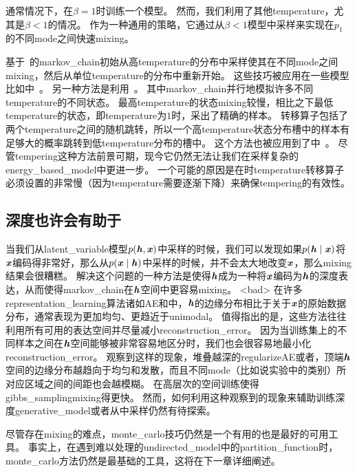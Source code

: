 通常情况下，在$\beta = 1$时训练一个模型。
然而，我们利用了其他\gls{temperature}，尤其是$\beta < 1$的情况。
作为一种通用的策略，它通过从$\beta<1$模型中采样来实现在$p_1$的不同\gls{mode}之间快速\gls{mixing}。

基于~\citep{Neal94b}的\gls{markov_chain}初始从高\gls{temperature}的分布中采样使其在不同\gls{mode}之间\gls{mixing}，然后从单位\gls{temperature}的分布中重新开始。
这些技巧被应用在一些模型比如中~\citep{Salakhutdinov-2010}。
另一种方法是利用~\citep{Iba-2001}。
其中\gls{markov_chain}并行地模拟许多不同\gls{temperature}的不同状态。
最高\gls{temperature}的状态\gls{mixing}较慢，相比之下最低\gls{temperature}的状态，即\gls{temperature}为$1$时，采出了精确的样本。
转移算子包括了两个\gls{temperature}之间的随机跳转，所以一个高\gls{temperature}状态分布槽中的样本有足够大的概率跳转到低\gls{temperature}分布的槽中。
这个方法也被应用到了中~\citep{Desjardins+al-2010-small,Cho10IJCNN}。
尽管\gls{tempering}这种方法前景可期，现今它仍然无法让我们在采样复杂的\gls{energy_based_model}中更进一步。
一个可能的原因是在时\gls{temperature}转移算子必须设置的非常慢（因为\gls{temperature}需要逐渐下降）来确保\gls{tempering}的有效性。



\subsection{深度也许会有助于}
\label{sec:depth_may_help_mixing}

当我们从\gls{latent_variable}模型$p(\boldsymbol{\mathit{h}},\boldsymbol{\mathit{x}})$中采样的时候，我们可以发现如果$p(\boldsymbol{\mathit{h}}\mid \boldsymbol{\mathit{x}})$将$\boldsymbol{\mathit{x}}$编码得非常好，那么从$p(\boldsymbol{\mathit{x}} \mid \boldsymbol{\mathit{h}})$中采样的时候，并不会太大地改变$\boldsymbol{\mathit{x}}$，那么\gls{mixing}结果会很糟糕。
解决这个问题的一种方法是使得$\boldsymbol{\mathit{h}}$成为一种将$\boldsymbol{\mathit{x}}$编码为$\boldsymbol{\mathit{h}}$的深度表达，从而使得\gls{markov_chain}在$\boldsymbol{\mathit{h}}$空间中更容易\gls{mixing}。
<bad> 在许多\gls{representation_learning}算法诸如\gls{AE}和中，$\boldsymbol{\mathit{h}}$的边缘分布相比于关于$\boldsymbol{\mathit{x}}$的原始数据分布，通常表现为更加均匀、更趋近于\gls{unimodal}。
值得指出的是，这些方法往往利用所有可用的表达空间并尽量减小\gls{reconstruction_error}。
因为当训练集上的不同样本之间在$\boldsymbol{\mathit{h}}$空间能够被非常容易地区分时，我们也会很容易地最小化\gls{reconstruction_error}。
\citet{Bengio-et-al-ICML2013-small}观察到这样的现象，堆叠越深的\gls{regularize}\gls{AE}或者，顶端$\boldsymbol{\mathit{h}}$空间的边缘分布越趋向于均匀和发散，而且不同\gls{mode}（比如说实验中的类别）所对应区域之间的间距也会越模糊。
在高层次的空间训练使得\gls{gibbs_sampling}\gls{mixing}得更快。
然而，如何利用这种观察到的现象来辅助训练深度\gls{generative_model}或者从中采样仍然有待探索。

尽管存在\gls{mixing}的难点，\gls{monte_carlo}技巧仍然是一个有用的也是最好的可用工具。
事实上，在遇到难以处理的\gls{undirected_model}中的\gls{partition_function}时，\gls{monte_carlo}方法仍然是最基础的工具，这将在下一章详细阐述。












